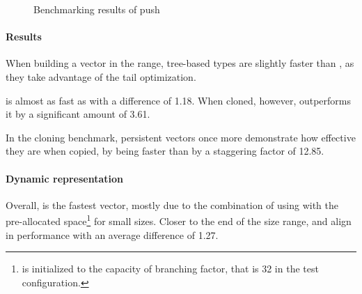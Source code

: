 \begin{figure}[!htbp]
\begin{adjustbox}{width=\textwidth}
    \end{adjustbox}

    \caption{Benchmarking results of push}
    \label{fig:push}
\end{figure}

\paragraph{Results}
When building a vector in the \range{[20, 100]} range, tree-based types are slightly faster than \stdvec{}, as they take advantage of the tail optimization.

\imrsvec{} is almost as fast as \rbvec{} with a difference of 1.18. When cloned, however, \rbvec{} outperforms it by a significant amount of 3.61.

In the cloning benchmark, persistent vectors once more demonstrate how effective they are when copied, by \rbvec{} being faster than \stdvec{} by a staggering factor of 12.85.

\paragraph{Dynamic representation}
Overall, \pvec{} is the fastest vector, mostly due to the combination of using \stdvec{} with the pre-allocated space\footnote{\pvec{} is initialized to the capacity of branching factor, that is 32 in the test configuration.} for small sizes. Closer to the end of the size range, \stdvec{} and \pvec{} align in performance with an average difference of 1.27.

